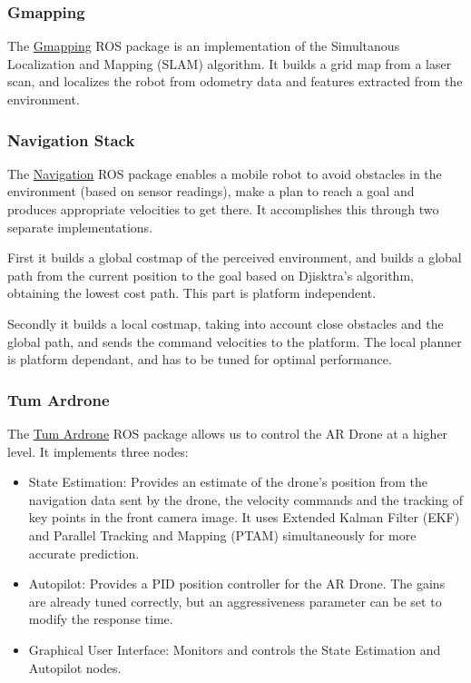\documentclass[11pt,a4paper]{article}
\begin{document}
\subsubsection{Gmapping}
The \href{http://wiki.ros.org/gmapping}{Gmapping} ROS package is an implementation of the Simultanous Localization and Mapping (SLAM) algorithm. It builds a grid map from a laser scan, and localizes the robot from odometry data and features extracted from the environment.

\subsubsection{Navigation Stack}
The \href{http://wiki.ros.org/navigation}{Navigation} ROS package enables a mobile robot to avoid obstacles in the environment (based on sensor readings), make a plan to reach a goal and produces appropriate velocities to get there. It accomplishes this through two separate implementations. 

First it builds a global costmap of the perceived environment, and builds a global path from the current position to the goal based on Djisktra's algorithm, obtaining the lowest cost path. This part is platform independent. 

Secondly it builds a local costmap, taking into account close obstacles and the global path, and sends the command velocities to the platform. The local planner is  platform dependant, and has to be tuned for optimal performance.

\subsubsection{Tum Ardrone}
The \href{http://wiki.ros.org/tum_ardrone}{Tum Ardrone} ROS package allows us to control the AR Drone at a higher level. It implements three nodes: 

\begin{itemize}
\item State Estimation: Provides an estimate of the drone's position from the navigation data sent by the drone, the velocity commands and the tracking of key points in the front camera image. It uses Extended Kalman Filter (EKF) and Parallel Tracking and Mapping (PTAM) simultaneously for more accurate prediction.

\item Autopilot: Provides a PID position controller for the AR Drone. The gains are already tuned correctly, but an aggressiveness parameter can be set to modify the response time.

\item Graphical User Interface: Monitors and controls the State Estimation and Autopilot nodes.

\end{itemize}
\end{document}
